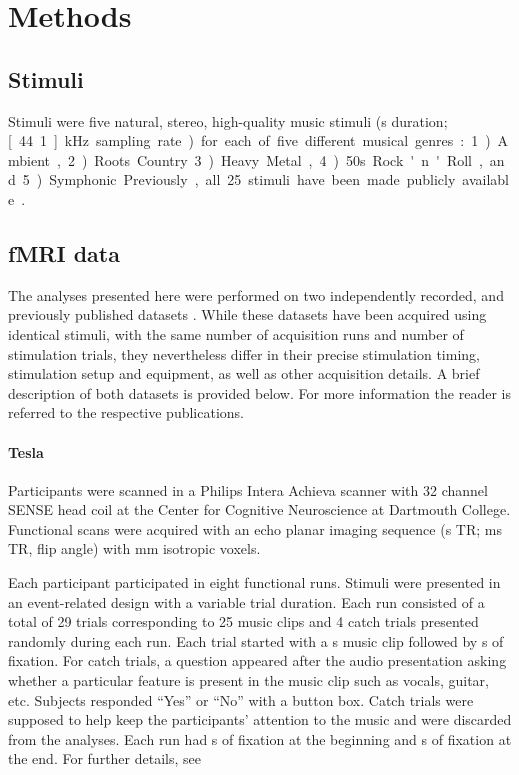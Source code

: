 \section*{Methods}

\subsection*{Stimuli}

Stimuli were five natural, stereo, high-quality music stimuli (\unit[6]{s}
duration; \unit[44.1]{kHz} sampling rate) for each of five different musical
genres: 1) Ambient, 2) Roots Country 3) Heavy Metal, 4) 50s Rock'n'Roll, and 5)
Symphonic. Previously, all 25 stimuli have been made publicly available
\citep{HDH+2015}.

\subsection*{f{MRI} data}

The analyses presented here were performed on two independently recorded, and
previously published datasets \citep{CTK+2012,HDH+2015}. While these datasets
have been acquired using identical stimuli, with the same number of acquisition
runs and number of stimulation trials, they nevertheless differ in their
precise stimulation timing, stimulation setup and equipment, as well as other
acquisition details. A brief description of both datasets is provided below.
For more information the reader is referred to the respective publications.

\paragraph{\unit[3]{Tesla}}
%
Participants were scanned in a Philips Intera Achieva scanner with 32 channel
SENSE head coil at the Center for Cognitive Neuroscience at Dartmouth College.
Functional scans were acquired with an echo planar imaging sequence
(\unit[2]{s} TR; \unit[35]{ms} TR, \unit[90]{\textdegree} flip angle) with
\unit[3]{mm} isotropic voxels.

Each participant participated in eight functional runs. Stimuli were presented in
an event-related design with a variable trial duration. Each run consisted of a
total of 29 trials corresponding to 25 music clips and 4 catch trials presented
randomly during each run. Each trial started with a \unit[6]{s} music clip
followed by \unit[4-8]{s} of fixation. For catch trials, a question appeared
after the audio presentation asking whether a particular feature is present in
the music clip such as vocals, guitar, etc. Subjects responded “Yes” or “No”
with a button box. Catch trials were supposed to help keep the participants’ attention to the
music and were discarded from the analyses. Each run had \unit[4]{s} of
fixation at the beginning and \unit[10]{s} of fixation at the end. For further
details, see \citet{CTK+2012}

